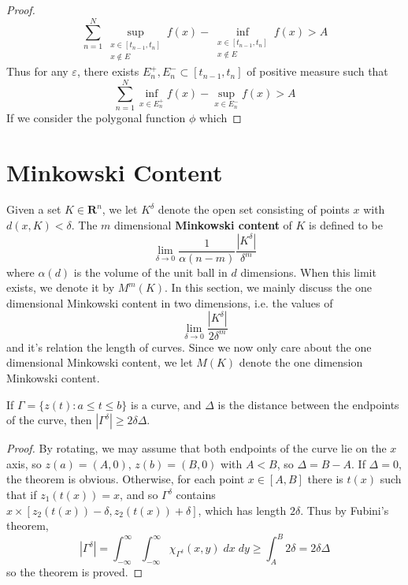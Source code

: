 \begin{proof}
  \[ \sum_{n = 1}^N \sup_{\substack{x \in [t_{n-1},t_n]\\x \not \in E}} f(x) - \inf_{\substack{x \in [t_{n-1},t_n]\\x \not \in E}} f(x) > A \]
  Thus for any $\varepsilon$, there exists $E_n^+, E_n^- \subset [t_{n-1},t_n]$ of positive measure such that
  \[ \sum_{n = 1}^N \inf_{x \in E_n^+} f(x) - \sup_{x \in E_n^-} f(x) > A \]
  If we consider the polygonal function $\phi$ which 
\end{proof}

\section{Minkowski Content}

Given a set $K \in \mathbf{R}^n$, we let $K^\delta$ denote the open set consisting of points $x$ with $d(x,K) < \delta$. The $m$ dimensional {\bf Minkowski content} of $K$ is defined to be
%
\[ \lim_{\delta \to 0} \frac{1}{\alpha(n-m)} \frac{|K^\delta|}{\delta^m} \]
%
where $\alpha(d)$ is the volume of the unit ball in $d$ dimensions. When this limit exists, we denote it by $M^m(K)$. In this section, we mainly discuss the one dimensional Minkowski content in two dimensions, i.e. the values of
%
\[ \lim_{\delta \to 0} \frac{|K^\delta|}{2 \delta^m} \]
%
and it's relation the length of curves. Since we now only care about the one dimensional Minkowski content, we let $M(K)$ denote the one dimension Minkowski content.

\begin{lemma}
  If $\Gamma = \{ z(t): a \leq t \leq b \}$ is a curve, and $\Delta$ is the distance between the endpoints of the curve, then $|\Gamma^\delta| \geq 2 \delta \Delta$.
\end{lemma}
\begin{proof}
  By rotating, we may assume that both endpoints of the curve lie on the $x$ axis, so $z(a) = (A,0)$, $z(b) = (B,0)$ with $A < B$, so $\Delta = B - A$. If $\Delta = 0$, the theorem is obvious. Otherwise, for each point $x \in [A,B]$ there is $t(x)$ such that if $z_1(t(x)) = x$, and so $\Gamma^\delta$ contains $x \times [z_2(t(x)) - \delta, z_2(t(x)) + \delta]$, which has length $2 \delta$. Thus by Fubini's theorem,
  \[ |\Gamma^\delta| = \int_{-\infty}^\infty \int_{-\infty}^\infty \chi_{\Gamma^\delta}(x,y)\; dx \;dy \geq \int_A^B 2 \delta = 2 \delta \Delta \]
  so the theorem is proved.
\end{proof}

